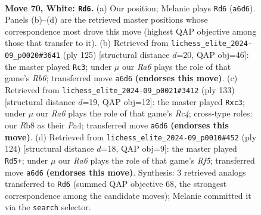 \documentclass[11pt]{article}
\begin{document}
\clearpage

\begin{figure}[p]\centering
\begin{subfigure}{0.46\textwidth}\centering
\resizebox{\linewidth}{!}{%
\newchessgame
\chessboard[
  setfen={1R6/5p2/R3p1k1/2r5/P3P3/5PK1/8/8 w - - 31 70},
  showmover=false,
  pgfstyle=straightmove, color=movearrow, markmove={a6-d6}
]}
\caption{}
\end{subfigure}\hfill
\begin{subfigure}{0.46\textwidth}\centering
\resizebox{\linewidth}{!}{%
\newchessgame
\chessboard[
  setfen={8/8/5kp1/R6p/7P/1r3P1K/6P1/8 b - - 23 63},
  showmover=false,
  pgfstyle=straightmove, color=movearrow, markmove={b3-c3}
]}
\caption{}
\end{subfigure}
\\[4pt]
\begin{subfigure}{0.46\textwidth}\centering
\resizebox{\linewidth}{!}{%
\newchessgame
\chessboard[
  setfen={8/7k/4KP2/1pr4p/p7/2P2P2/8/6R1 b - - 2 67},
  showmover=false,
  pgfstyle=straightmove, color=movearrow, markmove={c5-c3}
]}
\caption{}
\end{subfigure}\hfill
\begin{subfigure}{0.46\textwidth}\centering
\resizebox{\linewidth}{!}{%
\newchessgame
\chessboard[
  setfen={8/8/8/1P3Rp1/4r1P1/4p2P/3k2K1/8 w - - 4 63},
  showmover=false,
  pgfstyle=straightmove, color=movearrow, markmove={f5-d5}
]}
\caption{}
\end{subfigure}
\caption{\textbf{Move 70, White: \texttt{Rd6}.} (a) Our position; Melanie plays \texttt{Rd6} (\texttt{a6d6}). Panels (b)--(d) are the retrieved master positions whose correspondence most drove this move (highest QAP objective among those that transfer to it). (b) Retrieved from \texttt{lichess\_elite\_2024-09\_p0020\#3641} (ply 125) [structural distance $d$=20, QAP obj=46]: the master played \texttt{Rc3}; under $\mu$ our \emph{Ra6} plays the role of that game's \emph{Rb6}; transferred move \texttt{a6d6} \textbf{(endorses this move)}. (c) Retrieved from \texttt{lichess\_elite\_2024-09\_p0021\#3412} (ply 133) [structural distance $d$=19, QAP obj=12]: the master played \texttt{Rxc3}; under $\mu$ our \emph{Ra6} plays the role of that game's \emph{Rc4}; cross-type roles: our \emph{R}b8 as their \emph{P}a4; transferred move \texttt{a6d6} \textbf{(endorses this move)}. (d) Retrieved from \texttt{lichess\_elite\_2024-09\_p0010\#452} (ply 124) [structural distance $d$=18, QAP obj=9]: the master played \texttt{Rd5+}; under $\mu$ our \emph{Ra6} plays the role of that game's \emph{Rf5}; transferred move \texttt{a6d6} \textbf{(endorses this move)}. Synthesis: 3 retrieved analogs transferred to \texttt{Rd6} (summed QAP objective 68, the strongest correspondence among the candidate moves); Melanie committed it via the \texttt{search} selector.}
\label{fig:thought-m138}
\end{figure}
\end{document}
